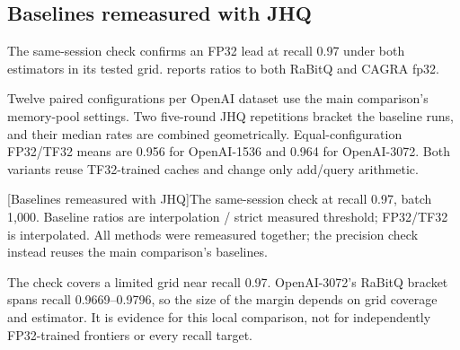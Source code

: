\subsection{Baselines remeasured with JHQ}
\label{sec:b-precision-anchors}

The same-session check confirms an FP32 lead at recall 0.97 under
both estimators in its tested grid. 
reports ratios to both RaBitQ and CAGRA fp32.

Twelve paired configurations per OpenAI dataset use the main
comparison's memory-pool settings. Two five-round JHQ repetitions
bracket the baseline runs, and their median rates are combined
geometrically. Equal-configuration FP32/TF32 means are 0.956 for
OpenAI-1536 and 0.964 for OpenAI-3072. Both variants reuse TF32-trained
caches and change only add/query arithmetic.

\par\medskip\noindent\begin{minipage}{\linewidth}
\captionsetup{hypcap=false}
\centering
{}[Baselines remeasured with JHQ]{The same-session check at recall 0.97, batch 1,000. Baseline ratios are interpolation / strict measured threshold; FP32/TF32 is interpolated. All methods were remeasured together; the precision check instead reuses the main comparison's baselines.}
\label{tab:b-precision-anchors}
\footnotesize\setlength{\tabcolsep}{3pt}

\end{minipage}\par\medskip

The check covers a limited grid near recall 0.97. OpenAI-3072's RaBitQ
bracket spans recall 0.9669--0.9796, so the size of the margin depends
on grid coverage and estimator. It is evidence for this local comparison,
not for independently FP32-trained frontiers or every recall target.

